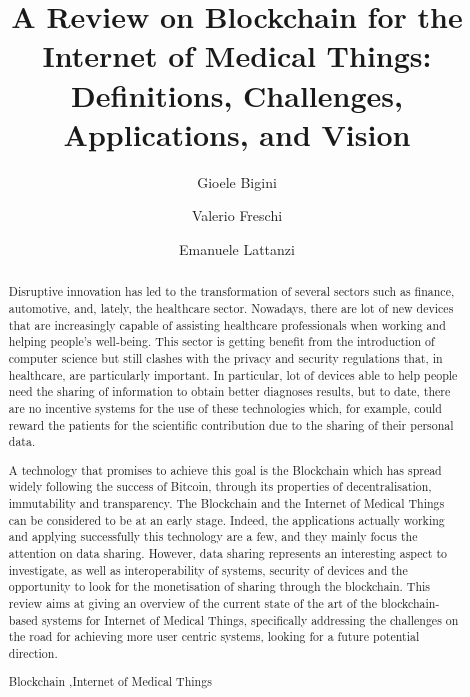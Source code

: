 \documentclass[preprint]{elsarticle}
\begin{document}
\title{A Review on Blockchain for the Internet of Medical Things: Definitions, Challenges, Applications, and Vision}

\author[1]{Gioele Bigini}%
\author[1]{Valerio Freschi}%
\author[1]{Emanuele Lattanzi}%


\address[1]{Department of Pure and Applied Sciences, University of Urbino\\Piazza della Repubblica 13, 61029 Urbino, Italy}

\begin{abstract}
Disruptive innovation has led to the transformation of several sectors such as finance, automotive, and, lately, the healthcare sector.
Nowadays, there are lot of new devices that are increasingly capable of assisting healthcare professionals when working and helping people's well-being. 
This sector is getting benefit from the introduction of computer science but still clashes with the privacy and security regulations that, in healthcare, are particularly important.
In particular, lot of devices able to help people need the sharing of information to obtain better diagnoses results, but to date, there are no incentive systems for the use of these technologies which, for example, could reward the patients for the scientific contribution due to the sharing of their personal data.
 
A technology that promises to achieve this goal is the Blockchain which has spread widely following the success of Bitcoin, through its properties of decentralisation, immutability and transparency.
The Blockchain and the Internet of Medical Things can be considered to be at an early stage. Indeed, the applications actually working and applying successfully this technology are a few, and they mainly focus the attention on data sharing.
However, data sharing represents an interesting aspect to investigate, as well as interoperability of systems, security of devices and the opportunity to look for the monetisation of sharing through the blockchain. This review aims at giving an overview of the current state of the art of the blockchain-based systems for Internet of Medical Things, specifically addressing the challenges on the road for achieving more user centric systems, looking for a future potential direction.\\

	\begin{keyword}
	Blockchain \sep Internet of Medical Things
    \end{keyword}
\end{abstract}
\end{document}
